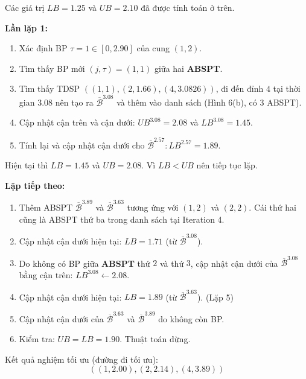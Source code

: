 \documentclass[../main.tex]{subfiles}
\begin{document}
Các giá trị \(LB=1.25\) và \(UB=2.10\) đã được tính toán ở trên.

\textbf{Lần lặp 1:}

\begin{enumerate}
\def\labelenumi{\arabic{enumi}.}
\tightlist
\item
  Xác định BP \(\tau = 1 \in [0, 2.90]\) của cung \((1, 2)\).
\item
  Tìm thấy BP mới \((j, \tau) = (1, 1)\) giữa hai \textbf{ABSPT}.
\item
  Tìm thấy TDSP \(((1, 1), (2, 1.66), (4, 3.0826))\), đi đến đỉnh \(4\)
  tại thời gian \(3.08\) nên tạo ra \(\overline{\mathcal B}^{3.08}\) và thêm
  vào danh sách (Hình 6(b), có 3 ABSPT).
\item
  Cập nhật cận trên và cận dưới: \(UB^{3.08} = 2.08\) và
  \(LB^{3.08} = 1.45\).
\item
  Tính lại và cập nhật cận dưới cho
  \(\overline{\mathcal B}^{2.57} : LB^{2.57} = 1.89.\)
\end{enumerate}

Hiện tại thì \(LB=1.45\) và \(UB = 2.08\). Vì \(LB<UB\) nên tiếp tục
lặp.

\textbf{Lặp tiếp theo:}

\begin{enumerate}
\def\labelenumi{\arabic{enumi}.}
\tightlist
\item
  Thêm ABSPT \(\overline{\mathcal B}^{3.89}\) và
  \(\overline{\mathcal B}^{3.63}\) tương ứng với \((1, 2)\) và \((2, 2)\).
  Cái thứ hai cũng là ABSPT thứ ba trong danh sách tại Iteration 4.
\item
  Cập nhật cận dưới hiện tại: \(LB = 1.71\) (từ
  \(\overline{\mathcal B}^{3.08}\)).
\item
  Do không có BP giữa \textbf{ABSPT} thứ \(2\) và thứ \(3\), cập
  nhật cận dưới của \(\overline{\mathcal B}^{3.08}\) bằng cận trên:
  \(LB^{3.08} \gets 2.08\).
\item
  Cập nhật cận dưới hiện tại: \(LB = 1.89\) (từ
  \(\overline{\mathcal B}^{3.63}\)). (Lặp 5)
\item
  Cập nhật cận dưới của \(\overline{\mathcal B}^{3.63}\) và
  \(\overline{\mathcal B}^{3.89}\) do không còn BP.
\item
  Kiểm tra: \(UB = LB = 1.90\). Thuật toán dừng.
\end{enumerate}

Kết quả nghiệm tối ưu (đường đi tối ưu):
\[((1, 2.00), (2, 2.14), (4, 3.89))\]
\backmatter
\end{document}
